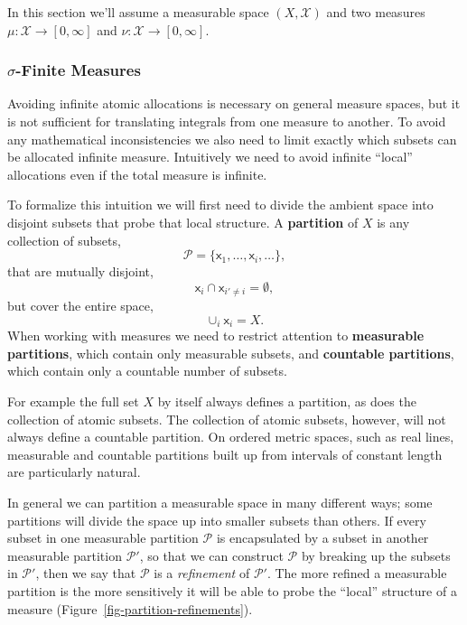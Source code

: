 \documentclass[
  letterpaper,
  DIV=11,
  numbers=noendperiod]{scrartcl}
\begin{document}
In this section we'll assume a measurable space \((X, \mathcal{X})\) and
two measures \(\mu : \mathcal{X} \rightarrow [0, \infty]\) and
\(\nu : \mathcal{X} \rightarrow [0, \infty]\).

\hypertarget{sigma-finite-measures}{%
\subsubsection{\texorpdfstring{{\(\sigma\)}-Finite
Measures}{\textbackslash sigma-Finite Measures}}\label{sigma-finite-measures}}

Avoiding infinite atomic allocations is necessary on general measure
spaces, but it is not sufficient for translating integrals from one
measure to another. To avoid any mathematical inconsistencies we also
need to limit exactly which subsets can be allocated infinite measure.
Intuitively we need to avoid infinite ``local'' allocations even if the
total measure is infinite.

To formalize this intuition we will first need to divide the ambient
space into disjoint subsets that probe that local structure. A
\textbf{partition} of \(X\) is any collection of subsets, \[
\mathcal{P}
= \{ \mathsf{x}_{1}, \ldots, \mathsf{x}_{i}, \ldots \},
\] that are mutually disjoint, \[
\mathsf{x}_{i} \cap \mathsf{x}_{i' \ne i} = \emptyset,
\] but cover the entire space, \[
\cup_{i} \mathsf{x}_{i} = X.
\] When working with measures we need to restrict attention to
\textbf{measurable partitions}, which contain only measurable subsets,
and \textbf{countable partitions}, which contain only a countable number
of subsets.

For example the full set \(X\) by itself always defines a partition, as
does the collection of atomic subsets. The collection of atomic subsets,
however, will not always define a countable partition. On ordered metric
spaces, such as real lines, measurable and countable partitions built up
from intervals of constant length are particularly natural.

In general we can partition a measurable space in many different ways;
some partitions will divide the space up into smaller subsets than
others. If every subset in one measurable partition \(\mathcal{P}\) is
encapsulated by a subset in another measurable partition
\(\mathcal{P}'\), so that we can construct \(\mathcal{P}\) by breaking
up the subsets in \(\mathcal{P}'\), then we say that \(\mathcal{P}\) is
a \emph{refinement} of \(\mathcal{P}'\). The more refined a measurable
partition is the more sensitively it will be able to probe the ``local''
structure of a measure (Figure~\ref{fig-partition-refinements}).
\end{document}
